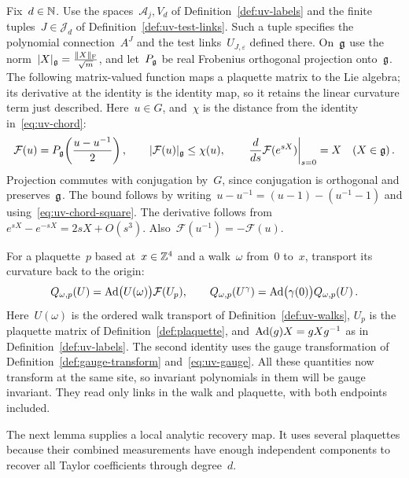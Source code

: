 Fix~$d\in\mathbb N$.
Use the spaces~$\mathcal A_j,V_d$ of Definition~\ref{def:uv-labels} and the finite tuples~$J\in\mathcal J_d$ of Definition~\ref{def:uv-test-links}.
Such a tuple specifies the polynomial connection~$A^J$ and the test links~$U_{J,\varepsilon}$ defined there.
On~$\mathfrak g$ use the norm~$|X|_\mathfrak g=\frac{\|X\|_{\mathrm F}}{\sqrt m}$, and let~$P_\mathfrak g$ be real Frobenius orthogonal projection onto~$\mathfrak g$.
The following matrix-valued function maps a plaquette matrix to the Lie algebra; its derivative at the identity is the identity map, so it retains the linear curvature term just described. Here~$u\in G$, and~$\chi$ is the distance from the identity in~\eqref{eq:uv-chord}:
\begin{equation}\label{eq:uv-curvature}
 \mathcal F(u)=P_\mathfrak g\!\left(\frac{u-u^{-1}}{2}\right),\qquad
 |\mathcal F(u)|_\mathfrak g\le\chi(u),\qquad
 \left.\frac{d}{ds}\mathcal F(e^{sX})\right|_{s=0}=X\quad(X\in\mathfrak g)\,.
\end{equation}
Projection commutes with conjugation by~$G$, since conjugation is orthogonal and preserves~$\mathfrak g$.
The bound follows by writing~$u-u^{-1}=(u-1)-(u^{-1}-1)$ and using~\eqref{eq:uv-chord-square}.
The derivative follows from~$e^{sX}-e^{-sX}=2sX+O(s^3)$.
Also~$\mathcal F(u^{-1})=-\mathcal F(u)$.

For a plaquette~$p$ based at~$x\in\mathbb Z^4$ and a walk~$\omega$ from~$0$ to~$x$, transport its curvature back to the origin:
\begin{equation}\label{eq:uv-transported-curvature}
 Q_{\omega,p}(U)=\operatorname{Ad}\bigl(U(\omega)\bigr)\mathcal F(U_p),\qquad
 Q_{\omega,p}(U^\gamma)=\operatorname{Ad}\bigl(\gamma(0)\bigr)Q_{\omega,p}(U)\,.
\end{equation}
Here~$U(\omega)$ is the ordered walk transport of Definition~\ref{def:uv-walks}, $U_p$ is the plaquette matrix of Definition~\ref{def:plaquette}, and~$\operatorname{Ad}(g)X=gXg^{-1}$ as in Definition~\ref{def:uv-labels}.
The second identity uses the gauge transformation of Definition~\ref{def:gauge-transform} and~\eqref{eq:uv-gauge}.
All these quantities now transform at the same site, so invariant polynomials in them will be gauge invariant.
They read only links in the walk and plaquette, with both endpoints included.

The next lemma supplies a local analytic recovery map.
It uses several plaquettes because their combined measurements have enough independent components to recover all Taylor coefficients through degree~$d$.

